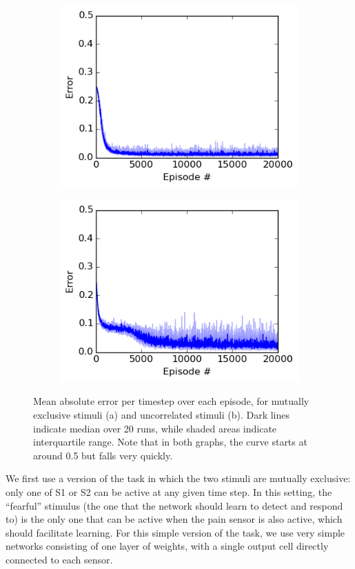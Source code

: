 \documentclass{article}
\begin{document}
\begin{figure}
\centering
\begin{subfigure}[t]{0.4\textwidth}
\centering
\includegraphics[scale=0.5]{figexcl.png}
\end{subfigure}
\begin{subfigure}[t]{0.4\textwidth}
\centering
\includegraphics[scale=0.5]{figuncorr.png}
\end{subfigure}
\caption{Mean absolute error per timestep over each episode, for mutually
exclusive stimuli (a) and uncorrelated stimuli (b). Dark lines indicate median
over 20 runs, while shaded areas indicate interquartile range. Note that in both
graphs, the curve starts at
around 0.5 but falls very quickly.}
\label{fig:error}
\end{figure}


We first use a version of the task in which the two stimuli are mutually
exclusive: only one of S1 or S2 can be active at any given time step. In this
setting, the ``fearful'' stimulus (the one that the network should learn to
detect and respond to) is the only one that can be active when the
pain sensor is also active, which should facilitate learning. 
For this simple version of the task, we use very simple networks consisting of one layer of weights, with a single
output cell directly connected to each sensor. 
\end{document}
